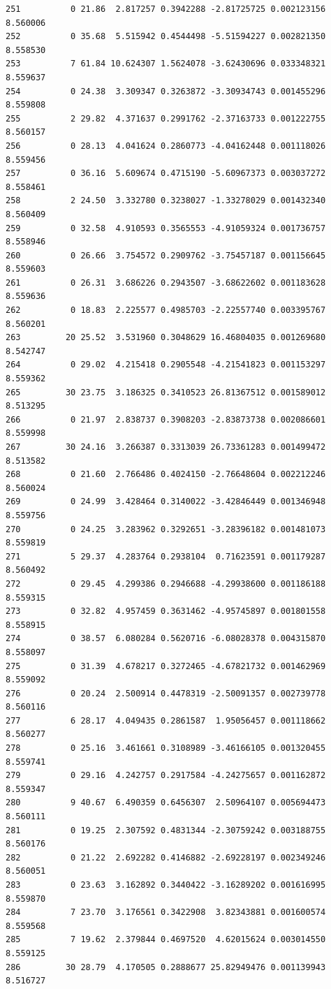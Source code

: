 \documentclass[]{book}
\theoremstyle{definition}
\theoremstyle{definition}
\theoremstyle{definition}
\theoremstyle{remark}
\begin{document}
\begin{verbatim}
251          0 21.86  2.817257 0.3942288 -2.81725725 0.002123156 8.560006
252          0 35.68  5.515942 0.4544498 -5.51594227 0.002821350 8.558530
253          7 61.84 10.624307 1.5624078 -3.62430696 0.033348321 8.559637
254          0 24.38  3.309347 0.3263872 -3.30934743 0.001455296 8.559808
255          2 29.82  4.371637 0.2991762 -2.37163733 0.001222755 8.560157
256          0 28.13  4.041624 0.2860773 -4.04162448 0.001118026 8.559456
257          0 36.16  5.609674 0.4715190 -5.60967373 0.003037272 8.558461
258          2 24.50  3.332780 0.3238027 -1.33278029 0.001432340 8.560409
259          0 32.58  4.910593 0.3565553 -4.91059324 0.001736757 8.558946
260          0 26.66  3.754572 0.2909762 -3.75457187 0.001156645 8.559603
261          0 26.31  3.686226 0.2943507 -3.68622602 0.001183628 8.559636
262          0 18.83  2.225577 0.4985703 -2.22557740 0.003395767 8.560201
263         20 25.52  3.531960 0.3048629 16.46804035 0.001269680 8.542747
264          0 29.02  4.215418 0.2905548 -4.21541823 0.001153297 8.559362
265         30 23.75  3.186325 0.3410523 26.81367512 0.001589012 8.513295
266          0 21.97  2.838737 0.3908203 -2.83873738 0.002086601 8.559998
267         30 24.16  3.266387 0.3313039 26.73361283 0.001499472 8.513582
268          0 21.60  2.766486 0.4024150 -2.76648604 0.002212246 8.560024
269          0 24.99  3.428464 0.3140022 -3.42846449 0.001346948 8.559756
270          0 24.25  3.283962 0.3292651 -3.28396182 0.001481073 8.559819
271          5 29.37  4.283764 0.2938104  0.71623591 0.001179287 8.560492
272          0 29.45  4.299386 0.2946688 -4.29938600 0.001186188 8.559315
273          0 32.82  4.957459 0.3631462 -4.95745897 0.001801558 8.558915
274          0 38.57  6.080284 0.5620716 -6.08028378 0.004315870 8.558097
275          0 31.39  4.678217 0.3272465 -4.67821732 0.001462969 8.559092
276          0 20.24  2.500914 0.4478319 -2.50091357 0.002739778 8.560116
277          6 28.17  4.049435 0.2861587  1.95056457 0.001118662 8.560277
278          0 25.16  3.461661 0.3108989 -3.46166105 0.001320455 8.559741
279          0 29.16  4.242757 0.2917584 -4.24275657 0.001162872 8.559347
280          9 40.67  6.490359 0.6456307  2.50964107 0.005694473 8.560111
281          0 19.25  2.307592 0.4831344 -2.30759242 0.003188755 8.560176
282          0 21.22  2.692282 0.4146882 -2.69228197 0.002349246 8.560051
283          0 23.63  3.162892 0.3440422 -3.16289202 0.001616995 8.559870
284          7 23.70  3.176561 0.3422908  3.82343881 0.001600574 8.559568
285          7 19.62  2.379844 0.4697520  4.62015624 0.003014550 8.559125
286         30 28.79  4.170505 0.2888677 25.82949476 0.001139943 8.516727

\end{verbatim}
\end{document}
